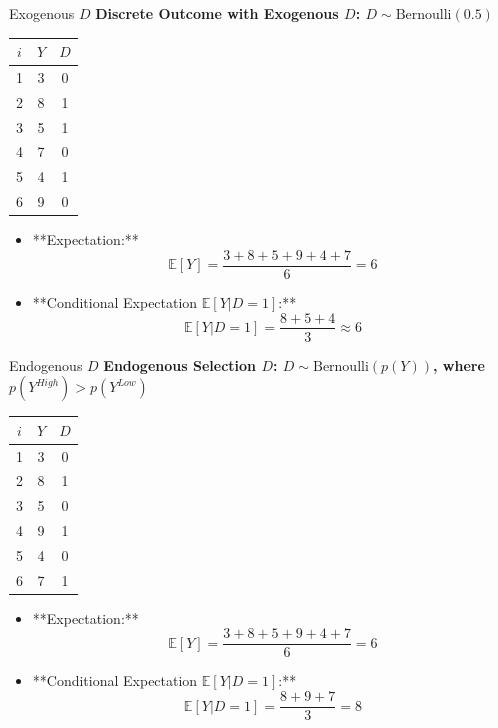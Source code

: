 \documentclass[xcolor=svgnames,t]{beamer}
\begin{document}
\begin{frame}{Exogenous \( D \)}
    \textbf{Discrete Outcome with Exogenous \( D \): \( D \sim \text{Bernoulli}(0.5) \)}
    
    \begin{table}[]
        \centering
        \begin{tabular}{|c|c|c|}
        \hline
        \( i \) & \( Y \) & \( D \) \\ \hline
        1 & 3  & 0 \\ \hline
        \rowcolor{blue!20} 2 & 8  & 1 \\ \hline
        \rowcolor{blue!20} 3 & 5  & 1 \\ \hline
        4 & 7  & 0 \\ \hline
        \rowcolor{blue!20} 5 & 4  & 1 \\ \hline
        6 & 9  & 0 \\ \hline
        \end{tabular}
        \end{table}
        \pause     
    \small{
    \begin{itemize}
      \item **Expectation:**
      \[
      \mathbb{E}[Y] = \frac{3 + 8 + 5 + 9 + 4 + 7}{6} = 6
      \]
      \pause\item **Conditional Expectation \( \mathbb{E}[Y | D = 1] \):**
      \[
      \mathbb{E}[Y | D = 1] = \frac{8 + 5 + 4}{3} \approx 6
      \]
    \end{itemize}
    }
\end{frame}



\begin{frame}{Endogenous \( D \)}
    \textbf{Endogenous Selection \( D \): \( D \sim \text{Bernoulli}(p(Y)) \), where \( p(Y^{High}) > p(Y^{Low}) \)}
    
    \begin{table}[]
        \centering
        \begin{tabular}{|c|c|c|}
        \hline
        \( i \) & \( Y \) & \( D \) \\ \hline
        1 & 3  & 0 \\ \hline
        \rowcolor{blue!20} 2 & 8  & 1 \\ \hline
        3 & 5  & 0 \\ \hline
        \rowcolor{blue!20} 4 & 9  & 1 \\ \hline
        5 & 4  & 0 \\ \hline
        \rowcolor{blue!20} 6 & 7  & 1 \\ \hline
        \end{tabular}
        \end{table}
        

    \small{
    \begin{itemize}
      \item **Expectation:**
      \[
      \mathbb{E}[Y] = \frac{3 + 8 + 5 + 9 + 4 + 7}{6} = 6
      \]
      \item **Conditional Expectation \( \mathbb{E}[Y | D = 1] \):**
      \[
      \mathbb{E}[Y | D = 1] = \frac{8 + 9 + 7}{3} = 8
      \]
    \end{itemize}
    }
\end{frame}
\end{document}
